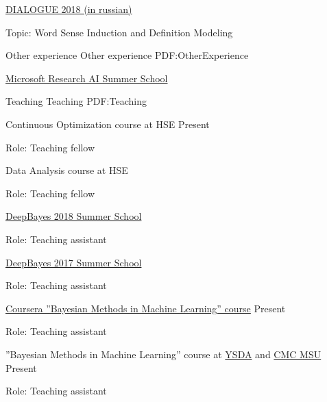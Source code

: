 \documentclass[letterpaper,MMMyyyy,nonstopmode]{simpleresumecv}
\begin{document}
\begin{Body}
\Gap
\Item
\href{http://www.dialog-21.ru/en/}{DIALOGUE 2018 (in russian)}
\begin{Detail}
\Item
Topic: Word Sense Induction and Definition Modeling
\end{Detail}



\Section
{Other experience}
{Other experience}
{PDF:OtherExperience}

\Gap
\BulletItem
\href{https://www.microsoft.com/en-us/research/event/ai-summer-school-2018/}{Microsoft Research AI Summer School}
\hfill
{}

\BigGap


\Section
{Teaching}
{Teaching}
{PDF:Teaching}

\BulletItem
Continuous Optimization course at HSE
\hfill
Present
\begin{Detail}
\Item
Role: Teaching fellow
\end{Detail}

\BulletItem
Data Analysis course at HSE
\hfill
{}
\begin{Detail}
\Item
Role: Teaching fellow
\end{Detail}

\BulletItem
\href{http://deepbayes.ru}{DeepBayes 2018 Summer School}
\hfill
{}
\begin{Detail}
\Item
Role: Teaching assistant
\end{Detail}

\Gap

\BulletItem
\href{http://deepbayes.ru/2017/}{DeepBayes 2017 Summer School}
\hfill
{}
\begin{Detail}
\Item
Role: Teaching assistant
\end{Detail}

\Gap

\BulletItem
\href{https://www.coursera.org/learn/bayesian-methods-in-machine-learning}
{Coursera ”Bayesian Methods in Machine Learning” course}
\hfill
Present
\begin{Detail}
\Item
Role: Teaching assistant
\end{Detail}

\Gap

\BulletItem
”Bayesian Methods in Machine Learning” course at \href{https://yandexdataschool.com}{YSDA}
and \href{https://cs.msu.ru/en}{CMC MSU}
\hfill
Present
\begin{Detail}
\Item
Role: Teaching assistant
\end{Detail}


\end{Body}
\end{document}
